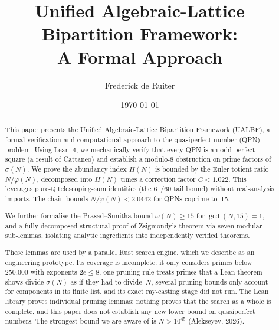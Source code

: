 \documentclass[11pt,a4paper]{article}
\title{Unified Algebraic-Lattice Bipartition Framework:\\
       A Formal Approach}
\author{Frederick de Ruiter}
\date{\today}
\begin{document}


\maketitle

\begin{abstract}
This paper presents the Unified Algebraic-Lattice Bipartition Framework
(UALBF), a formal-verification and computational
approach to the quasiperfect number (QPN) problem. Using Lean~4,
we mechanically verify that every QPN is an odd perfect square
(a result of Cattaneo) and
establish a modulo-8 obstruction on prime factors of $\sigma(N)$.
We prove the abundancy index $H(N)$ is bounded by the Euler
totient ratio $N/\varphi(N)$, decomposed into $H(N)$ times a correction
factor $C < 1.022$. This leverages pure-$\mathbb{Q}$ telescoping-sum identities
(the 61/60 tail bound) without real-analysis imports. The chain
bounds $N/\varphi(N) < 2.0442$ for QPNs coprime to~15.

We further formalise the Prasad--Sunitha bound $\omega(N)\ge 15$ for
$\gcd(N,15)=1$, and a fully decomposed structural proof of Zsigmondy's
theorem via seven modular sub-lemmas, isolating analytic ingredients
into independently verified theorems.

These lemmas are used by a parallel Rust search engine, which we
describe as an engineering prototype. Its coverage is incomplete:
it only considers primes below 250{,}000 with exponents $2e \le 8$,
one pruning rule treats primes that a Lean theorem shows divide
$\sigma(N)$ as if they had to divide~$N$, several pruning bounds only account for
components in its finite list, and its exact ray-casting stage did
not run. The Lean library proves individual pruning lemmas; nothing
proves that the search as a whole is complete, and this paper does
not establish any new lower bound on quasiperfect numbers. The
strongest bound we are aware of is $N > 10^{45}$ (Alekseyev, 2026).
\end{abstract}












\end{document}
